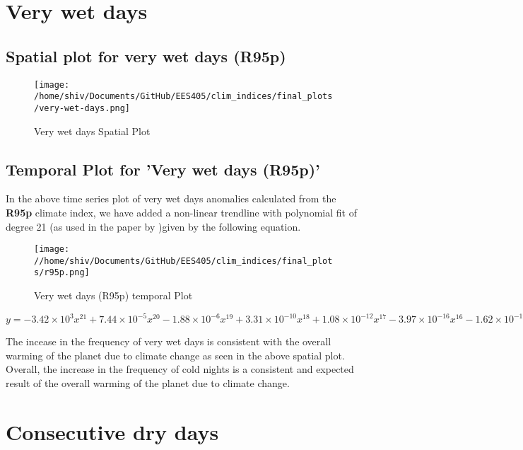 \documentclass[a4paper, 12pt, twoside]{report}
\begin{document}
\section{Very wet days}
\subsection{Spatial plot for very wet days (R95p)}
\begin{figure}[htb]
    \centering
    \texttt{[image: /home/shiv/Documents/GitHub/EES405/clim\_indices/final\_plots/very-wet-days.png]}
    \caption{Very wet days Spatial Plot}
    \label{fig:r95p_spatial}
\end{figure}

\subsection{Temporal Plot for 'Very wet days (R95p)'}
In the above time series plot of very wet days anomalies calculated from the \textbf{R95p} climate index, we have added a non-linear trendline with polynomial fit of degree 21 (as used in the paper by )given by the following equation. \\
\begin{figure}[htb]
    \centering
    \texttt{[image: //home/shiv/Documents/GitHub/EES405/clim\_indices/final\_plots/r95p.png]}
    \caption{Very wet days (R95p) temporal Plot}
    \label{fig:r95p_temporal}
\end{figure}

$ y = -3.42\times10^{3}x^{21}+7.44\times10^{-5}x^{20}-1.88\times10^{-6}x^{19}+3.31\times10^{-10}x^{18}+1.08\times10^{-12}x^{17}-3.97\times10^{-16}x^{16}-1.62\times10^{-19}x^{15}+1.05\times10^{-22}x^{14}-5.80\times10^{-27}x^{13}-8.00\times10^{-30}x^{12}+2.29\times10^{-33}x^{11}-1.20\times10^{-37}x^{10}-6.72\times10^{-41}x^{9}+1.99\times10^{-44}x^{8}-2.95\times10^{-48}x^{7}+2.85\times10^{-52}x^{6}-1.92\times10^{-56}x^{5}+9.12\times10^{-61}x^{4}-3.03\times10^{-65}x^{3}+6.69\times10^{-70}x^{2}-8.87\times10^{-75}x+5.34\times10^{-80}$

The incease in the frequency of very wet days is consistent with the overall warming of the planet due to climate change as seen in the above spatial plot.\\
Overall, the increase in the frequency of cold nights is a consistent and expected result of the overall warming of the planet due to climate change.

\section {Consecutive dry days}
\end{document}
